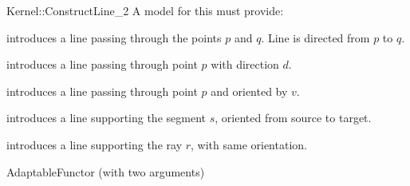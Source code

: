\begin{ccRefFunctionObjectConcept}{Kernel::ConstructLine_2}
A model for this must provide:


            {introduces a line  passing through the points $p$ and $q$. 
             Line  is directed from $p$ to $q$.}

            {introduces a line  passing through point $p$ with 
             direction $d$.}

            {introduces a line  passing through point $p$ and
             oriented by $v$.}

            {introduces a line  supporting the segment $s$,
            oriented from source to target.}

            {introduces a line  supporting the ray $r$,
            with same orientation.}

\ccRefines
AdaptableFunctor (with two arguments)

\ccSeeAlso
{}  \\

\end{ccRefFunctionObjectConcept}
